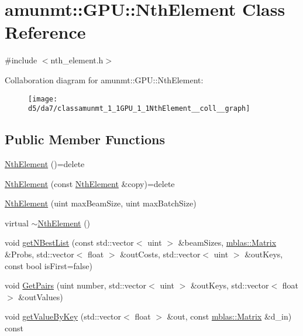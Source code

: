 \hypertarget{classamunmt_1_1GPU_1_1NthElement}{}\section{amunmt\+:\+:G\+PU\+:\+:Nth\+Element Class Reference}
\label{classamunmt_1_1GPU_1_1NthElement}


{\ttfamily \#include $<$nth\+\_\+element.\+h$>$}



Collaboration diagram for amunmt\+:\+:G\+PU\+:\+:Nth\+Element\+:
\nopagebreak
\begin{figure}[H]
\begin{center}
\leavevmode
\texttt{[image: d5/da7/classamunmt\_1\_1GPU\_1\_1NthElement\_\_coll\_\_graph]}
\end{center}
\end{figure}
\subsection*{Public Member Functions}
\begin{DoxyCompactItemize}
\item 
\hyperlink{classamunmt_1_1GPU_1_1NthElement_a9481caa29f7c86f5eef0893e0eb0c179}{Nth\+Element} ()=delete
\item 
\hyperlink{classamunmt_1_1GPU_1_1NthElement_a2fd3cfcd80c78af56bbffa10e2a86b61}{Nth\+Element} (const \hyperlink{classamunmt_1_1GPU_1_1NthElement}{Nth\+Element} \&copy)=delete
\item 
\hyperlink{classamunmt_1_1GPU_1_1NthElement_a2309a381e27377ca51a9befa39d2fb88}{Nth\+Element} (uint max\+Beam\+Size, uint max\+Batch\+Size)
\item 
virtual \hyperlink{classamunmt_1_1GPU_1_1NthElement_a35b16ed77f4e2981ad0cc38a2d60dfe8}{$\sim$\+Nth\+Element} ()
\item 
void \hyperlink{classamunmt_1_1GPU_1_1NthElement_aaed3b2c335f19a3e95dbbc4f5bc899db}{get\+N\+Best\+List} (const std\+::vector$<$ uint $>$ \&beam\+Sizes, \hyperlink{namespaceamunmt_1_1GPU_1_1mblas_ab67821a8254de53e45a623cf73c0aef6}{mblas\+::\+Matrix} \&Probs, std\+::vector$<$ float $>$ \&out\+Costs, std\+::vector$<$ uint $>$ \&out\+Keys, const bool is\+First=false)
\item 
void \hyperlink{classamunmt_1_1GPU_1_1NthElement_aee660af609c4cd3787bed4c7a457df08}{Get\+Pairs} (uint number, std\+::vector$<$ uint $>$ \&out\+Keys, std\+::vector$<$ float $>$ \&out\+Values)
\item 
void \hyperlink{classamunmt_1_1GPU_1_1NthElement_a76f1dcaa21cab7d3dae79e8065df2e3a}{get\+Value\+By\+Key} (std\+::vector$<$ float $>$ \&out, const \hyperlink{namespaceamunmt_1_1GPU_1_1mblas_ab67821a8254de53e45a623cf73c0aef6}{mblas\+::\+Matrix} \&d\+\_\+in) const 
\end{DoxyCompactItemize}
